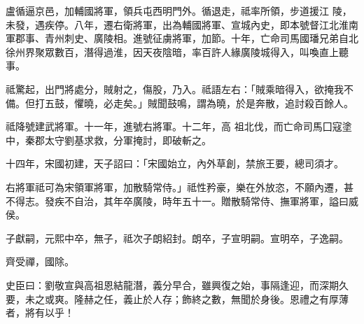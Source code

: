 \begin{pinyinscope}
 盧循逼京邑，加輔國將軍，領兵屯西明門外。循退走，祗率所領，步道援江
 陵，未發，遇疾停。八年，遷右衛將軍，出為輔國將軍、宣城內史，即本號督江北淮南軍郡事、青州刺史、廣陵相。進號征虜將軍，加節。十年，亡命司馬國璠兄弟自北徐州界聚眾數百，潛得過淮，因天夜陰暗，率百許人緣廣陵城得入，叫喚直上聽事。



 祗驚起，出門將處分，賊射之，傷股，乃入。祗語左右：「賊乘暗得入，欲掩我不備。但打五鼓，懼曉，必走矣。」賊聞鼓鳴，謂為曉，於是奔散，追討殺百餘人。


祗降號建武將軍。十一年，進號右將軍。十二年，高
 祖北伐，而亡命司馬囗寇塗
 中，秦郡太守劉基求救，分軍掩討，即破斬之。



 十四年，宋國初建，天子詔曰：「宋國始立，內外草創，禁旅王要，總司須才。



 右將軍祗可為宋領軍將軍，加散騎常侍。」祗性矜豪，樂在外放恣，不願內遷，甚不得志。發疾不自治，其年卒廣陵，時年五十一。贈散騎常侍、撫軍將軍，謚曰威侯。



 子獻嗣，元熙中卒，無子，祗次子朗紹封。朗卒，子宣明嗣。宣明卒，子逸嗣。



 齊受禪，國除。



 史臣曰：劉敬宣與高祖恩結龍潛，義分早合，雖興復之始，事隔逢迎，而深期久要，未之或爽。隆赫之任，義止於人存；飾終之數，無聞於身後。恩禮之有厚薄者，將有以乎！



\end{pinyinscope}